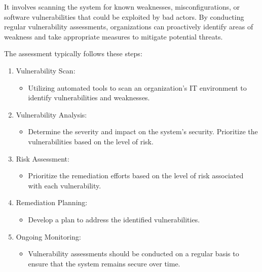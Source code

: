 It involves scanning the system for known weaknesses, misconfigurations, or software vulnerabilities that could be exploited by bad actors. By conducting regular vulnerability assessments, organizations can proactively identify areas of weakness and take appropriate measures to mitigate potential threats.

The assessment typically follows these steps: 

\begin{enumerate}
    \item Vulnerability Scan:
    \begin{itemize}
        \item Utilizing automated tools to scan an organization’s IT environment to identify vulnerabilities and weaknesses.
    \end{itemize}
    \item Vulnerability Analysis:
    \begin{itemize}
        \item Determine the severity and impact on the system's security. Prioritize the vulnerabilities based on the level of risk.
    \end{itemize}
    \item Risk Assessment:
    \begin{itemize}
        \item Prioritize the remediation efforts based on the level of risk associated with each vulnerability.
    \end{itemize}
    \item Remediation Planning:
    \begin{itemize}
        \item Develop a plan to address the identified vulnerabilities. 
    \end{itemize}
    \item Ongoing Monitoring:
    \begin{itemize}
        \item Vulnerability assessments should be conducted on a regular basis to ensure that the system remains secure over time.
    \end{itemize}
\end{enumerate}


